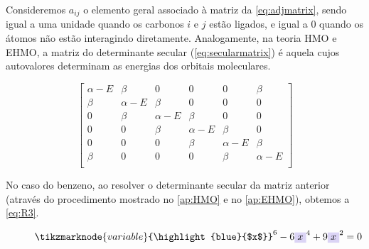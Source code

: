  Consideremos $a_{ij}$ o elemento geral associado à matriz da \autoref{eq:adjmatrix}, sendo igual a uma unidade quando os carbonos $i$ e $j$ estão ligados, e igual a $0$ quando os átomos não estão interagindo diretamente. Analogamente, na teoria \gls{HMO} e \gls{EHMO}, a matriz do determinante secular (\autoref{eq:secularmatrix}) é aquela cujos autovalores determinam as energias dos orbitais moleculares.

\begin{figure}[htb]
\vspace{0.8\baselineskip}
\begin{equation}
\label{eq:secularmatrix}
\begin{bmatrix}
    \alpha - E & \beta & 0 & 0 & 0 & \beta \\
    \beta & \alpha - E & \beta & 0 & 0 & 0 \\
    0 & \beta & \alpha - E & \beta & 0 & 0 \\
    0 & 0 & \beta & \alpha - E & \beta & 0 \\
    0 & 0 & 0 & \beta & \alpha - E & \beta \\
    \beta & 0 & 0 & 0 & \beta & \alpha - E \\
\end{bmatrix}
\end{equation}
\end{figure}

No caso do benzeno, ao resolver o determinante secular da matriz anterior (através do procedimento mostrado no \autoref{ap:HMO} e no \autoref{ap:EHMO}), obtemos a \autoref{eq:R3}.

\begin{figure}[htb]
\begin{equation}
    \label{eq:R3}
    \tikzmarknode{variable}{\highlight{blue}{$x$}}^6 - 6\highlight{blue}{$x$}^4 + 9\highlight{blue}{$x$}^2 = 0
\end{equation}
\vspace{2\baselineskip}
\end{figure}

